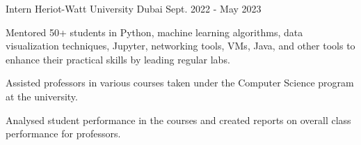 \begin{cventries}
	\cventry
	{Intern} %
	{Heriot-Watt University} %
	{Dubai} %
	{Sept. 2022 - May 2023} %
	{
		\begin{cvitems} %
			\item Mentored 50+ students in Python, machine learning algorithms,  data visualization techniques, Jupyter, networking tools, VMs, Java, and other tools to enhance their practical skills by leading regular labs.
			\item Assisted professors in various courses taken under the Computer Science program at the university.
			\item  Analysed student performance in the courses and created reports on overall class performance for professors.
		\end{cvitems}
	}
	
\end{cventries}
